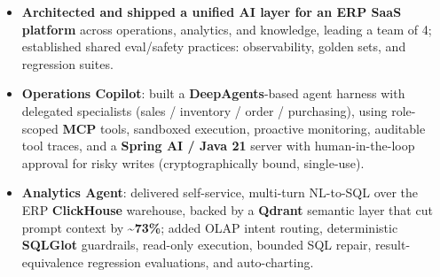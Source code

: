 \documentclass{resume-v2}
\begin{document}
\begin{itemize}
  \item \textbf{Architected and shipped a unified AI layer for an ERP SaaS platform} across operations, analytics, and knowledge, leading a team of 4; established shared eval/safety practices: observability, golden sets, and regression suites.
  \item \textbf{Operations Copilot}: built a \textbf{DeepAgents}-based agent harness with delegated specialists (sales / inventory / order / purchasing), using role-scoped \textbf{MCP} tools, sandboxed execution, proactive monitoring, auditable tool traces, and a \textbf{Spring AI / Java 21} server with human-in-the-loop approval for risky writes (cryptographically bound, single-use).
  \item \textbf{Analytics Agent}: delivered self-service, multi-turn NL-to-SQL over the ERP \textbf{ClickHouse} warehouse, backed by a \textbf{Qdrant} semantic layer that cut prompt context by \textbf{\textasciitilde73\%}; added OLAP intent routing, deterministic \textbf{SQLGlot} guardrails, read-only execution, bounded SQL repair, result-equivalence regression evaluations, and auto-charting.

\end{itemize}
\end{document}
